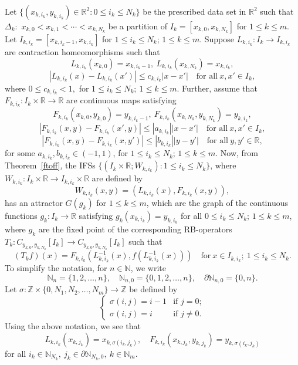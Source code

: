 \documentclass[10pt]{amsart}
\theoremstyle{definition}
\newcommand{\myseries}[3]{#1\leq #2\leq #3}
\newcommand{\myfunction}[3]{#1:#2\rightarrow#3}
\begin{document}
	Let $\{(x_{k,i_k},y_{k,i_k})\in\mathbb{R}^2:\myseries{0}{i_k}{N_k}\}$ be the prescribed data set in $\mathbb{R}^2$ such that $\Delta_k:$ $x_{k,0}<x_{k,1}<\cdots<x_{k,N_k}$ be a partition of $I_k=[x_{k,0},x_{k,N_k}]$ for $\myseries{1}{k}{m}$. Let $I_{k,i_k}=[x_{k,i_k-1},x_{k,i_k}]$ for $\myseries{1}{i_k}{N_k}$; $\myseries{1}{k}{m}$. Suppose $L_{k,i_k}:I_k\rightarrow I_{k,i_k}$ are contraction homeomorphisms such that
	\begin{equation}
		L_{k,i_k}(x_{k,0})=x_{k,i_k-1},~L_{k,i_k}(x_{k,N_k})=x_{k,i_k}, \label{equ8}
	\end{equation}
	\begin{equation}
		|L_{k,i_k}(x)-L_{k,i_k}(x')|\leq c_{k,i_k}|x-x'|\quad\mbox{for all}~ x,x'\in I_k, \label{equ9}
	\end{equation}
	where $0\leq c_{k,i_k}<1,$ for $\myseries{1}{i_k}{N_k};~\myseries{1}{k}{m}.$
	Further, assume that $F_{k,i_k}:I_k\times\mathbb{R}\rightarrow\mathbb{R}$ are continuous maps satisfying
	$$F_{k,i_k}(x_{k,0},y_{k,0})=y_{k,i_k-1},~F_{k,i_k}(x_{k,N_k},y_{k,N_k})=y_{k,i_k},$$
	$$|F_{k,i_k}(x,y)-F_{k,i_k}(x',y)|\leq |a_{k,i_k}||x-x'|\quad\mbox{for all}~ x,x'\in I_k,$$
	$$|F_{k,i_k}(x,y)-F_{k,i_k}(x,y')|\leq |b_{k,i_k}||y-y'|\quad\mbox{for all}~ y,y'\in\mathbb{R},$$
	for some $a_{k,i_k},b_{k,i_k}\in (-1,1)$, for $\myseries{1}{i_k}{N_k}$; $\myseries{1}{k}{m}$.
	Now, from Theorem~\ref{ftoff}, the IFSs $\{(I_k\times\mathbb{R};W_{k,i_k}):\myseries{1}{i_k}{N_k}\}$, where $W_{k,i_k}:I_k\times\mathbb{R}\rightarrow I_{k,i_k}\times\mathbb{R}$ are defined by $$W_{k,i_k}(x,y)=(L_{k,i_k}(x),F_{k,i_k}(x,y)),$$
	has an attractor $G(g_k)$ for $\myseries{1}{k}{m}$, which are the graph of the continuous functions $\myfunction{g_k}{I_k}{\mathbb{R}}$ satisfying $g_k(x_{k,i_k})=y_{k,i_k}$ for all $\myseries{0}{i_k}{N_k}$; $\myseries{1}{k}{m}$, where $g_k$ are the fixed point of the corresponding RB-operators $T_k:C_{y_{k,0},y_{k,N_k}}[I_k]\rightarrow C_{y_{k,0},y_{k,N_k}}[I_k]$ such that
	\begin{equation}
		(T_kf)(x)=F_{k,i_k}(L_{k,i_k}^{-1}(x),f(L_{k,i_k}^{-1}(x)))\quad\mbox{for}~x\in I_{k,i_k};~\myseries{1}{i_k}{N_k}. \label{prodrbop}
	\end{equation}  
	To simplify the notation, for $n\in\mathbb{N}$, we write 
	$$\mathbb{N}_n=\{1,2,\ldots,n\},\quad\mathbb{N}_{n,0}=\{0,1,2,\ldots,n\},\quad\partial\mathbb{N}_{n,0}=\{0,n\}.$$ 
	Let $\sigma:\mathbb{Z}\times\{0,N_1,N_2,\ldots,N_m\}\rightarrow\mathbb{Z}$ be defined by 
	\begin{equation}
		\left\{ \begin{array}{ll}
			\sigma(i,j)=i-1 & \textrm{if $j=0$};\\
			\sigma(i,j)=i & \textrm{if $j\neq 0$}.
		\end{array} \right.
	\end{equation}
	Using the above notation, we see that 
	\begin{equation}
		L_{k,i_k}(x_{k,j_k})=x_{k,\sigma(i_k,j_k)},\quad F_{k,i_k}(x_{k,j_k},y_{k,j_k})=y_{k,\sigma(i_k,j_k)}
		\label{contpoint}
	\end{equation}
	for all $i_k\in\mathbb{N}_{N_k},~j_k\in \partial\mathbb{N}_{N_k,0},~ k\in\mathbb{N}_m.$\\
	
\end{document}
